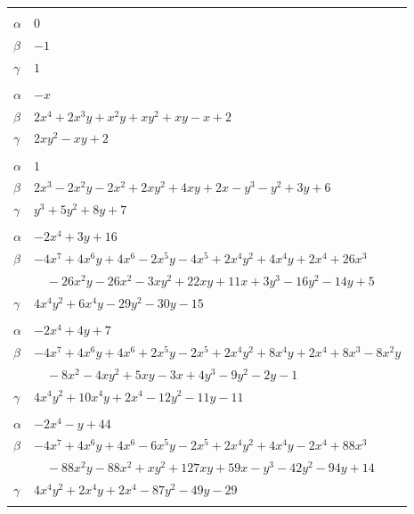 \documentclass[11pt]{article}
\begin{document}
\begin{longtable}{@{}ll@{}}
\addlinespace[3pt]
\multicolumn{2}{@{}l}{$\{i,j\}=\{5,15\}$, $k_{ij}=2$}\\
$\alpha$ & $0$\\
$\beta$ & $-1$\\
$\gamma$ & $1$\\
\addlinespace[3pt]
\multicolumn{2}{@{}l}{$\{i,j\}=\{5,21\}$, $k_{ij}=2$}\\
$\alpha$ & $-x$\\
$\beta$ & $2x^{4}+2x^{3}y+x^{2}y+xy^{2}+xy-x+2$\\
$\gamma$ & $2xy^{2}-xy+2$\\
\addlinespace[3pt]
\multicolumn{2}{@{}l}{$\{i,j\}=\{6,15\}$, $k_{ij}=2\cdot 5$}\\
$\alpha$ & $1$\\
$\beta$ & $2x^{3}-2x^{2}y-2x^{2}+2xy^{2}+4xy+2x-y^{3}-y^{2}+3y+6$\\
$\gamma$ & $y^{3}+5y^{2}+8y+7$\\
\addlinespace[3pt]
\multicolumn{2}{@{}l}{$\{i,j\}=\{6,18\}$, $k_{ij}=3^{3}$}\\
$\alpha$ & $-2x^{4}+3y+16$\\
$\beta$ & $-4x^{7}+4x^{6}y+4x^{6}-2x^{5}y-4x^{5}+2x^{4}y^{2}+4x^{4}y+2x^{4}+26x^{3}$\\
 & $\quad -26x^{2}y-26x^{2}-3xy^{2}+22xy+11x+3y^{3}-16y^{2}-14y+5$\\
$\gamma$ & $4x^{4}y^{2}+6x^{4}y-29y^{2}-30y-15$\\
\addlinespace[3pt]
\multicolumn{2}{@{}l}{$\{i,j\}=\{6,22\}$, $k_{ij}=3\cdot 5$}\\
$\alpha$ & $-2x^{4}+4y+7$\\
$\beta$ & $-4x^{7}+4x^{6}y+4x^{6}+2x^{5}y-2x^{5}+2x^{4}y^{2}+8x^{4}y+2x^{4}+8x^{3}-8x^{2}y$\\
 & $\quad -8x^{2}-4xy^{2}+5xy-3x+4y^{3}-9y^{2}-2y-1$\\
$\gamma$ & $4x^{4}y^{2}+10x^{4}y+2x^{4}-12y^{2}-11y-11$\\
\addlinespace[3pt]
\multicolumn{2}{@{}l}{$\{i,j\}=\{6,26\}$, $k_{ij}=3^{2}\cdot 5$}\\
$\alpha$ & $-2x^{4}-y+44$\\
$\beta$ & $-4x^{7}+4x^{6}y+4x^{6}-6x^{5}y-2x^{5}+2x^{4}y^{2}+4x^{4}y-2x^{4}+88x^{3}$\\
 & $\quad -88x^{2}y-88x^{2}+xy^{2}+127xy+59x-y^{3}-42y^{2}-94y+14$\\
$\gamma$ & $4x^{4}y^{2}+2x^{4}y+2x^{4}-87y^{2}-49y-29$\\
\addlinespace[3pt]
\multicolumn{2}{@{}l}{$\{i,j\}=\{7,9\}$, $k_{ij}=3^{2}$}\\

\end{longtable}
\end{document}
